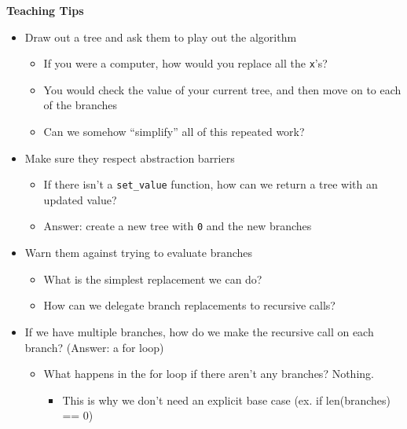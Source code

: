 \begin{guide}
	\begin{blocksection}
	\textbf{Teaching Tips}
	\begin{itemize}
			\item Draw out a tree and ask them to play out the algorithm
			\begin{itemize}
	                \item If you were a computer, how would you replace all the \lstinline{x}'s?
	                \item You would check the value of your current tree, and then move on to each of the branches
	                \item Can we somehow “simplify” all of this repeated work?
            \end{itemize}
		\item Make sure they respect abstraction barriers 
            \begin{itemize}
                \item If there isn't a \lstinline{set_value} function, how can we return a tree with an updated value?
                \item Answer: create a new tree with \lstinline{0} and the new branches
            \end{itemize}
		\item Warn them against trying to evaluate branches
            \begin{itemize}
                \item What is the simplest replacement we can do?
                \item How can we delegate branch replacements to recursive calls?
            \end{itemize}
            \item If we have multiple branches, how do we make the recursive call on each branch? (Answer: a for loop)
            \begin{itemize}
                \item What happens in the for loop if there aren’t any branches? Nothing.
                \begin{itemize}
                    \item This is why we don’t need an explicit base case (ex. if len(branches) == 0)
                \end{itemize}
            \end{itemize}
	\end{itemize}
	\end{blocksection}
\end{guide}

